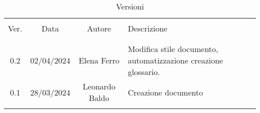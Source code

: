\documentclass[italian,12pt]{article}
\begin{document}
    

    \newpage

    

    \begin{table}[!h]
        \caption{Versioni}
        \begin{center}
            \begin{tabular}{ c c c p{9cm} }
                \hline                                                                                               \\[-2ex]
                Ver. & Data       & Autore         & Descrizione                                                     \\
                \\[-2ex] \hline \\[-1.5ex]
                0.2  & 02/04/2024 & Elena Ferro    & Modifica stile documento, automatizzazione creazione glossario. \\
                0.1  & 28/03/2024 & Leonardo Baldo & Creazione documento                                             \\
                \\[-1.5ex] \hline
            \end{tabular}
        \end{center}
    \end{table}

    \newpage

    \tableofcontents

    \printglossary[style=myaltlistgroup,title=]
\end{document}
